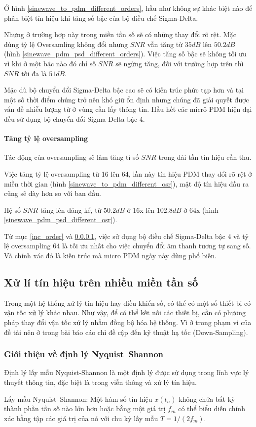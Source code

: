 Ở hình \ref{sinewave_to_pdm_different_orders}, hầu như không sự khác biệt nào để phân biệt tín hiệu khi tăng số bậc của bộ điều chế Sigma-Delta. 

Nhưng ở trường hợp này trong miền tần số sẽ có những thay đổi rõ rệt. Mặc dùng tỷ lệ Oversamling không đổi nhưng $SNR$ vẫn tăng từ $35dB$ lên $50.2dB$ (hình \ref{sinewave_pdm_psd_different_orders}).  Việc tăng số bậc sẽ không tối ưu vì khi ở một bậc nào đó chỉ số $SNR$ sẽ ngừng tăng, đối với trường hợp trên thì $SNR$ tối đa là $51dB$.

Mặc dù bộ chuyển đổi Sigma-Delta bậc cao sẽ có kiến trúc phức tạp hơn và tại một số thời điểm chúng trở nên khó giữ ổn định nhưng chúng đã giải quyết được vấn đề nhiễu lượng tử ở vùng cần lấy thông tin. Hầu hết các micrô PDM hiện đại đều sử dụng bộ chuyển đổi Sigma-Delta bậc 4.


\paragraph{Tăng tỷ lệ oversampling} \label{inc_sam}
Tác động của oversampling sẽ làm tăng tỉ số $SNR$ trong dải tần tín hiệu cần thu.

Việc tăng tỷ lệ oversampling từ 16 lên 64, lần này tín hiệu PDM thay đổi rõ rệt ở miền thời gian (hình \ref{sinewave_to_pdm_different_osr}), mật độ tín hiệu đầu ra cũng sẽ dày hơn so với ban đầu.

Hệ số $SNR$ tăng lên đáng kể, từ $50.2dB$ ở 16x lên $102.8dB$ ở 64x (hình \ref{sinewave_pdm_psd_different_osr}).

Từ mục \ref{inc_order} và \ref{inc_sam}, việc sử dụng bộ điều chế Sigma-Delta bậc 4 và tỷ lệ oversampling 64 là tối ưu nhất cho việc chuyển đổi âm thanh tương tự sang số. Và chính xác đó là kiến trúc mà micro PDM ngày này dùng phổ biến.

\subsection{Xử lí tín hiệu trên nhiều miền tần số}\label{xulynhieumientanso}
Trong một hệ thống xử lý tín hiệu hay điều khiển số, có thể có
một số thiết bị có vận tốc xử lý khác nhau. Như vậy, để có thể kết nối
các thiết bị, cần có phương pháp thay đổi vận tốc xử lý nhằm đồng
bộ hóa hệ thống. Vì ở trong phạm vi của đề tài nên ở trong bài báo cáo chỉ đề cập đến kỹ thuật hạ tốc (Down-Sampling).
\subsubsection{Giới thiệu về định lý Nyquist–Shannon}
Định lý lấy mẫu Nyquist-Shannon là một định lý được sử dụng trong lĩnh vực lý thuyết thông tin, đặc biệt là trong viễn thông và xử lý tín hiệu.
\begin{theorem}\label{dlnq} %
 Lấy mẫu Nyquist–Shannon: Một hàm số tín hiệu $x(t_n)$ không chứa bất kỳ thành phần tần số nào lớn hơn hoặc bằng một giá trị $f_m$ có thể biểu diễn chính xác bằng tập các giá trị của nó với chu kỳ lấy mẫu $T=1/(2f_m)$.
\end{theorem}

